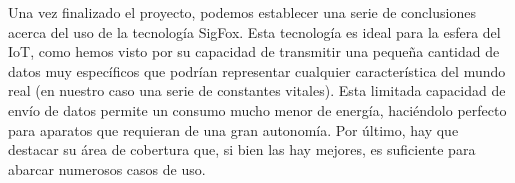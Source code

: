 \documentclass[12pt,a4paper]{article}
\begin{document}
Una vez finalizado el proyecto, podemos establecer una serie de conclusiones acerca del uso de la tecnología SigFox. Esta tecnología es ideal para la esfera del IoT, como hemos visto por su capacidad de transmitir una pequeña cantidad de datos muy específicos que podrían representar cualquier característica del mundo real (en nuestro caso una serie de constantes vitales). Esta limitada capacidad de envío de datos permite un consumo mucho menor de energía, haciéndolo perfecto para aparatos que requieran de una gran autonomía. Por último, hay que destacar su área de cobertura que, si bien las hay mejores, es suficiente para abarcar numerosos casos de uso.

\newpage


\end{document}
